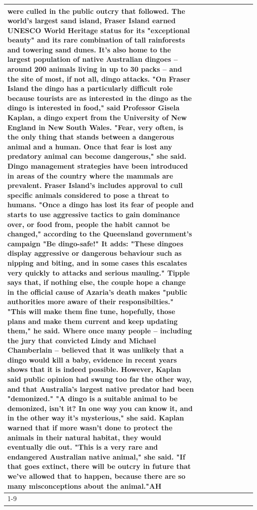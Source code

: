 \begin{table}[H]
\begin{tabular}{lllrlllll}
were culled in the public outcry that followed. The world's largest sand island, Fraser Island earned UNESCO World Heritage status for its "exceptional beauty" and its rare combination of tall rainforests and towering sand dunes. It's also home to the largest population of native Australian dingoes -- around 200 animals living in up to 30 packs -- and the site of most, if not all, dingo attacks. "On Fraser Island the dingo has a particularly difficult role because tourists are as interested in the dingo as the dingo is interested in food," said Professor Gisela Kaplan, a dingo expert from the University of New England in New South Wales. "Fear, very often, is the only thing that stands between a dangerous animal and a human. Once that fear is lost any predatory animal can become dangerous," she said. Dingo management strategies have been introduced in areas of the country where the mammals are prevalent. Fraser Island's includes approval to cull specific animals considered to pose a threat to humans. "Once a dingo has lost its fear of people and starts to use aggressive tactics to gain dominance over, or food from, people the habit cannot be changed," according to the Queensland government's campaign "Be dingo-safe!" It adds: "These dingoes display aggressive or dangerous behaviour such as nipping and biting, and in some cases this escalates very quickly to attacks and serious mauling." Tipple says that, if nothing else, the couple hope a change in the official cause of Azaria's death makes "public authorities more aware of their responsibilties." "This will make them fine tune, hopefully, those plans and make them current and keep updating them," he said. Where once many people -- including the jury that convicted Lindy and Michael Chamberlain -- believed that it was unlikely that a dingo would kill a baby, evidence in recent years shows that it is indeed possible. However, Kaplan said public opinion had swung too far the other way, and that Australia's largest native predator had been "demonized." "A dingo is a suitable animal to be demonized, isn't it? In one way you can know it, and in the other way it's mysterious," she said. Kaplan warned that if more wasn't done to protect the animals in their natural habitat, they would eventually die out. "This is a very rare and endangered Australian native animal," she said. "If that goes extinct, there will be outcry in future that we've allowed that to happen, because there are so many misconceptions about the animal."AH \\
\cline{1-9}

\end{tabular}
\end{table}
